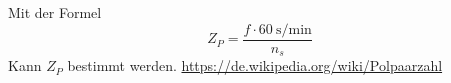 \chapter{}\label{ex:aufg4}
%
\section{}\label{sec:aufg4a}
Mit der Formel
\begin{equation}
	Z_P = \frac{f\cdot 60~\mathrm{s/min}}{n_s}
\end{equation}
Kann $Z_P$ bestimmt werden.
\url{https://de.wikipedia.org/wiki/Polpaarzahl}
\section{}\label{sec:aufg4b}

%
\section{}\label{sec:aufg4c}
%
